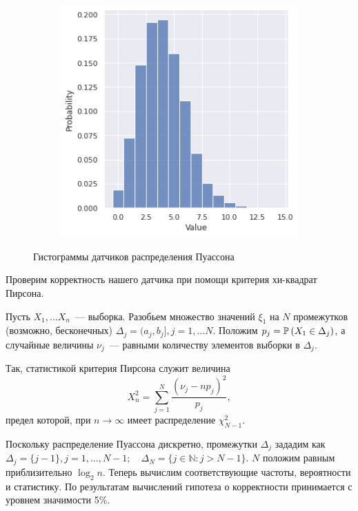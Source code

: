 \begin{figure}[tbp]
\begin{subfigure}[b]{0.48\textwidth}
            \includegraphics[width=\textwidth]{resources/task3_pois2.png}
            \caption{}
            \label{task3_pois2}
        \end{subfigure}
        \caption{Гистограммы датчиков распределения Пуассона}
    \end{figure}

    Проверим корректность нашего датчика при помощи критерия хи-квадрат Пирсона.

    Пусть $X_1,\ldots X_n$~--- выборка. Разобьем множество значений $\xi_1$ на 
    $N$ промежутков (возможно, бесконечных) $\Delta_j = (a_j, b_j], 
    j = 1,\ldots N.$ Положим $p_j = \mathbb{P}\left(X_1 \in \Delta_j\right)$, а случайные 
    величины $\nu_j$~--- равными количеству элементов выборки в $\Delta_j$.
    
    \newpage
    Так, статистикой критерия Пирсона служит величина 
    \begin{equation}
        X_n^2 = \sum\limits_{j=1}^N \dfrac{(\nu_j - n p_j)^2}{p_j},
    \end{equation}
    предел которой, при $n\rightarrow \infty$ имеет распределение $\chi_{N-1}^2$.

    Поскольку распределение Пуассона дискретно, промежутки $\Delta_j$ зададим 
    как $\Delta_j = \{j-1\}, j = 1,\ldots, N-1;\quad 
    \Delta_N = \{j\in \mathbb{N}: j > N-1\}$. $N$ положим равным приблизительно 
    $\log_2 n$. Теперь вычислим соответствующие частоты, вероятности и 
    статистику. По результатам вычислений гипотеза о корректности принимается с 
    уровнем значимости 5\%.

